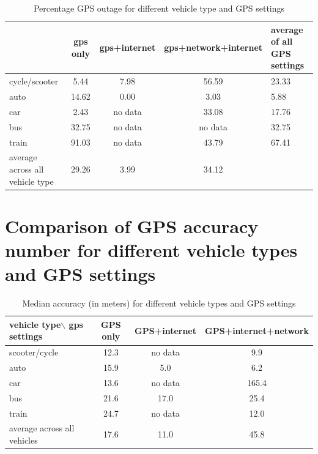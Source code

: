 \documentclass[12pt]{report}
\begin{document}
 \begin{table}[h!]
   \centering
   \caption{Percentage GPS outage for different vehicle type and GPS settings}
   \label{gps_outage_table}
   \begin{tabular}{|m{.9in}|c|c|c|l|}
     \hline
                                & gps only & gps+internet & gps+network+internet & average of all GPS settings \\ \hline
     cycle/scooter              & 5.44     & 7.98         & 56.59                & 23.33                       \\
     auto                       & 14.62    & 0.00         & 3.03                 & 5.88                        \\
     car                        & 2.43     & no data      & 33.08                & 17.76                       \\
     bus                        & 32.75    & no data      & no data              & 32.75                       \\
     train                      & 91.03    & no data      & 43.79                & 67.41                       \\ \hline
average across all vehicle type & 29.26    & 3.99         & 34.12                & 
     \\ \hline 
   \end{tabular}
 \end{table}

 \section{Comparison of GPS accuracy number for different vehicle types and GPS
   settings}

 \begin{table}

   \centering
   \caption{Median accuracy (in meters) for different vehicle types and GPS
     settings}
   \begin{tabular}{|l|c|c|c|}
     \hline
     vehicle type$\backslash$ gps settings & GPS only & GPS+internet & GPS+internet+network \\ \hline
     scooter/cycle                         & 12.3     & no data      & 9.9                  \\ \hline
     auto                                  & 15.9     & 5.0          & 6.2                  \\ \hline
     car                                   & 13.6     & no data      & 165.4                \\ \hline
     bus                                   & 21.6     & 17.0         & 25.4                 \\ \hline
     train                                 & 24.7     & no data      & 12.0                 \\ \hline
     average across all vehicles           & 17.6     & 11.0         & 45.8                 \\ \hline
   \end{tabular}

 \end{table}
\end{document}

